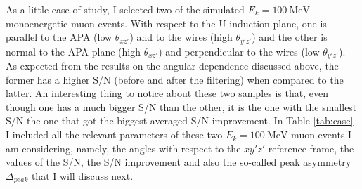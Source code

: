 As a little case of study, I selected two of the simulated $E_{k} = 100 \ \mathrm{MeV}$ monoenergetic muon events. With respect to the U induction plane, one is parallel to the APA (low $\theta_{xz'}$) and to the wires (high $\theta_{y'z'}$) and the other is normal to the APA plane (high $\theta_{xz'}$) and perpendicular to the wires (low $\theta_{y'z'}$). As expected from the results on the angular dependence discussed above, the former has a higher S/N (before and after the filtering) when compared to the latter. An interesting thing to notice about these two samples is that, even though one has a much bigger S/N than the other, it is the one with the smallest S/N the one that got the biggest averaged S/N improvement. In Table \ref{tab:case} I included all the relevant parameters of these two $E_{k} = 100 \ \mathrm{MeV}$ muon events I am considering, namely, the angles with respect to the $xy'z'$ reference frame, the values of the S/N, the S/N improvement and also the so-called peak asymmetry $\Delta_{peak}$ that I will discuss next.

